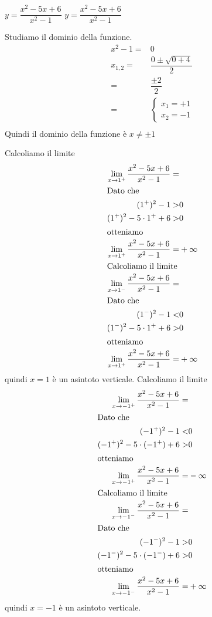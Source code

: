 \begin{exercise}
 $y=\dfrac{x^2-5x+6}{x^2-1}$
	\tcblower
	$y=\dfrac{x^2-5x+6}{x^2-1}$
	
Studiamo il dominio della funzione. 
\begin{align*}
x^2-1=&0\\ 
x_{1,2}=&\dfrac{0\pm\sqrt{0+4}}{2}\\
=&\dfrac{\pm 2}{2}\\
=&\begin{cases}
x_1=+1\\
x_2=-1
\end{cases}\\
\end{align*}
Quindi il dominio della funzione è  $x\neq\pm1$

Calcoliamo il limite
\begin{align*}
\lim_{x\to 1^+}\frac{x^2-5x+6}{x^2-1}=&\\
\intertext{Dato che}
(1^+)^2-1>&0\\
(1^+)^2-5\cdot 1^++6>&0\\
\intertext{otteniamo}
\lim_{x\to 1^+}\frac{x^2-5x+6}{x^2-1}=&+\infty\\
\intertext{Calcoliamo il limite}
\lim_{x\to 1^-}\frac{x^2-5x+6}{x^2-1}=&\\
\intertext{Dato che}
(1^-)^2-1<&0\\
(1^-)^2-5\cdot 1^++6>&0\\
\intertext{otteniamo}
\lim_{x\to 1^+}\frac{x^2-5x+6}{x^2-1}=&+\infty\\
\end{align*} 
quindi $x=1$ è un asintoto verticale.
Calcoliamo il limite
\begin{align*}
\lim_{x\to -1^+}\frac{x^2-5x+6}{x^2-1}=&\\
\intertext{Dato che}
(-1^+)^2-1<&0\\
(-1^+)^2-5\cdot (-1^+)+6>&0\\
\intertext{otteniamo}
\lim_{x\to -1^+}\frac{x^2-5x+6}{x^2-1}=&-\infty\\
\intertext{Calcoliamo il limite}
\lim_{x\to -1^-}\frac{x^2-5x+6}{x^2-1}=&\\
\intertext{Dato che}
(-1^-)^2-1>&0\\
(-1^-)^2-5\cdot (-1^-)+6>&0\\
\intertext{otteniamo}
\lim_{x\to -1^-}\frac{x^2-5x+6}{x^2-1}=&+\infty\\
\end{align*} 
quindi $x=-1$ è un asintoto verticale.
\end{exercise}
